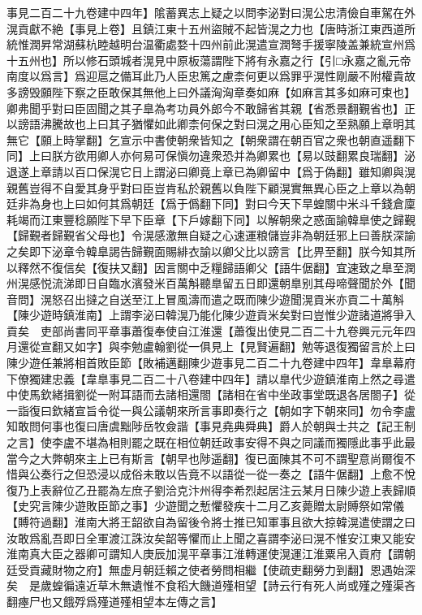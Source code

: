 事見二百二十九卷建中四年】隂蓄異志上疑之以問李泌對曰滉公忠清儉自車駕在外滉貢獻不絶【事見上卷】且鎮江東十五州盜賊不起皆滉之力也【唐時浙江東西道所統惟潤昇常湖蘇杭睦越明台温衢處婺十四州前此滉遣宣潤弩手援寧陵盖兼統宣州爲十五州也】所以修石頭城者滉見中原板蕩謂陛下將有永嘉之行【引□永嘉之亂元帝南度以爲言】爲迎扈之備耳此乃人臣忠篤之慮柰何更以爲罪乎滉性剛嚴不附權貴故多謗毁願陛下察之臣敢保其無他上曰外議洶洶章奏如麻【如麻言其多如麻可束也】卿弗聞乎對曰臣固聞之其子臯為考功員外郎今不敢歸省其親【省悉景翻覲省也】正以謗語沸騰故也上曰其子猶懼如此卿柰何保之對曰滉之用心臣知之至熟願上章明其無它【願上時掌翻】乞宣示中書使朝衆皆知之【朝衆謂在朝百官之衆也朝直遥翻下同】上曰朕方欲用卿人亦何易可保愼勿違衆恐并為卿累也【易以豉翻累良瑞翻】泌退遂上章請以百口保滉它日上謂泌曰卿竟上章已為卿留中【爲于偽翻】雖知卿與滉親舊豈得不自愛其身乎對曰臣豈肯私於親舊以負陛下顧滉實無異心臣之上章以為朝廷非為身也上曰如何其爲朝廷【爲于僞翻下同】對曰今天下旱蝗關中米斗千錢倉廩耗竭而江東豐稔願陛下早下臣章【下戶嫁翻下同】以解朝衆之惑面諭韓臯使之歸覲【歸覲者歸覲省父母也】令滉感激無自疑之心速運粮儲豈非為朝廷邪上曰善朕深諭之矣即下泌章令韓臯謁告歸覲面賜緋衣諭以卿父比以謗言【比畀至翻】朕今知其所以釋然不復信矣【復扶又翻】因言關中乏糧歸語卿父【語牛倨翻】宜速致之臯至潤州滉感悦流涕即日自臨水濱發米百萬斛聽臯留五日即還朝臯别其母啼聲聞於外【聞音問】滉怒召出撻之自送至江上冒風濤而遣之既而陳少遊聞滉貢米亦貢二十萬斛【陳少遊時鎮淮南】上謂李泌曰韓滉乃能化陳少遊貢米矣對曰豈惟少遊諸道將爭入貢矣　吏部尚書同平章事蕭復奉使自江淮還【蕭復出使見二百二十九卷興元元年四月還從宣翻又如字】與李勉盧翰劉從一俱見上【見賢遍翻】勉等退復獨留言於上曰陳少遊任兼將相首敗臣節【敗補邁翻陳少遊事見二百二十九卷建中四年】韋臯幕府下僚獨建忠義【韋臯事見二百二十八卷建中四年】請以臯代少遊鎮淮南上然之尋遣中使馬欽緒揖劉從一附耳語而去諸相還閤【諸相在省中坐政事堂既退各居閤子】從一詣復曰欽緒宣旨令從一與公議朝來所言事即奏行之【朝如字下朝來同】勿令李盧知敢問何事也復曰唐虞黜陟岳牧僉諧【事見堯典舜典】爵人於朝與士共之【記王制之言】使李盧不堪為相則罷之既在相位朝廷政事安得不與之同議而獨隱此事乎此最當今之大弊朝來主上已有斯言【朝早也陟遥翻】復已面陳其不可不謂聖意尚爾復不惜與公奏行之但恐浸以成俗未敢以告竟不以語從一從一奏之【語牛倨翻】上愈不悅復乃上表辭位乙丑罷為左庶子劉洽克汴州得李希烈起居注云某月日陳少遊上表歸順【史究言陳少遊敗臣節之事】少遊聞之慙懼發疾十二月乙亥薨贈太尉賻祭如常儀【賻符過翻】淮南大將王韶欲自為留後令將士推已知軍事且欲大掠韓滉遣使謂之曰汝敢爲亂吾即日全軍渡江誅汝矣韶等懼而止上聞之喜謂李泌曰滉不惟安江東又能安淮南真大臣之器卿可謂知人庚辰加滉平章事江淮轉運使滉運江淮粟帛入貢府【謂朝廷受貢藏財物之府】無虚月朝廷賴之使者勞問相繼【使疏吏翻勞力到翻】恩遇始深矣　是歲蝗徧遠近草木無遺惟不食稻大饑道殣相望【詩云行有死人尚或殣之殣渠吝翻瘞尸也又餓殍爲殣道殣相望本左傳之言】

